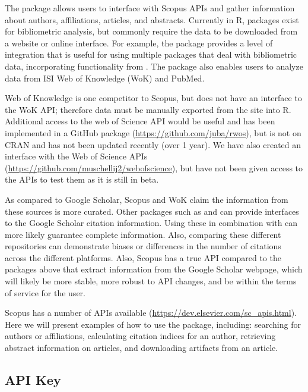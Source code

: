 The  package allows users to interface with Scopus APIs and
gather information about authors, affiliations, articles, and abstracts.
Currently in R, packages exist for bibliometric analysis, but commonly
require the data to be downloaded from a website or online interface.
For example, the  \citep{bibliometrix} package
provides a level of integration that is useful for using multiple
packages that deal with bibliometric data, incorporating functionality
from . The  package also enables
users to analyze data from ISI Web of Knowledge (WoK) and PubMed.

Web of Knowledge is one competitor to Scopus, but 
does not have an interface to the WoK API; therefore data must be
manually exported from the site into R. Additional access to the web of
Science API would be useful and has been implemented in a GitHub package
 (\url{https://github.com/juba/rwos}), but is not on CRAN and
has not been updated recently (over 1 year). We have also created an
interface with the Web of Science APIs
(\url{https://github.com/muschellij2/webofscience}), but have not been
given access to the APIs to test them as it is still in beta.

As compared to Google Scholar, Scopus and WoK claim the information from
these sources is more curated. Other packages such as 
\citep{scholar} and  \citep{gcite} can provide interfaces
to the Google Scholar citation information. Using these in combination
with  can more likely guarantee complete information. Also,
comparing these different repositories can demonstrate biases or
differences in the number of citations across the different platforms.
Also, Scopus has a true API compared to the packages above that extract
information from the Google Scholar webpage, which will likely be more
stable, more robust to API changes, and be within the terms of service
for the user.

Scopus has a number of APIs available
(\url{https://dev.elsevier.com/sc_apis.html}). Here we will present
examples of how to use the  package, including: searching
for authors or affiliations, calculating citation indices for an author,
retrieving abstract information on articles, and downloading artifacts
from an article.

\hypertarget{api-key}{%
\subsection{API Key}\label{api-key}}

